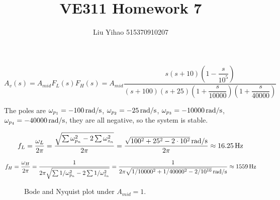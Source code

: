 \documentclass{article}
\title{VE311 Homework 7}
\author{Liu Yihao 515370910207}
\date{}
\newcommand{\unit}[1]{{\rm\,#1}}
\begin{document}
\maketitle

\section{}
$$A_v(s)=A_{mid}F_L(s)F_H(s)=A_{mid}\frac{s(s+10)\left(1-\dfrac{s}{10^5}\right)}{(s+100)(s+25)\left(1+\dfrac{s}{10000}\right)\left(1+\dfrac{s}{40000}\right)}$$

The poles are $\omega_{p_1}=-100\unit{rad/s}$, $\omega_{p_2}=-25\unit{rad/s}$, $\omega_{p_3}=-10000\unit{rad/s}$, $\omega_{p_4}=-40000\unit{rad/s}$, they are all negative, so the system is stable.

$$f_L=\frac{\omega_L}{2\pi}=\frac{\sqrt{\sum\omega_{p_n}^2-2\sum\omega_{z_n}^2}}{2\pi}=\frac{\sqrt{100^2+25^2-2\cdot10^2}\unit{rad/s}}{2\pi}\approx16.25\unit{Hz}$$

$$f_H=\frac{\omega_H}{2\pi}=\frac{1}{2\pi\sqrt{\sum1/\omega_{p_n}^2-2\sum1/\omega_{z_n}^2}}=\frac{1}{2\pi\sqrt{1/10000^2+1/40000^2-2/10^{10}}\unit{rad/s}}\approx1559\unit{Hz}$$

\begin{figure}[!htbp]
	\centering
	\caption{Bode and Nyquist plot under $A_{mid}=1$.}
\end{figure}
\end{document}
